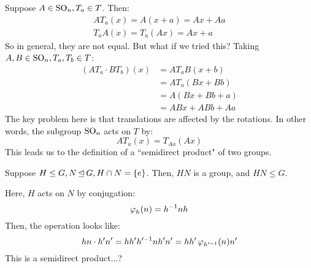 Suppose $ A \in \operatorname{SO}_{n}, T_{a} \in T $. Then:
\begin{gather*}
    AT_{a}(x) = A(x + a) = Ax + Aa \\
    T_{a}A(x) = T_{a}(Ax) = Ax + a
\end{gather*}
So in general, they are not equal. But what if we tried this?
Taking $ A, B \in \operatorname{SO}_{n}, T_{a}, T_{b} \in T $:
\begin{align*}
    (AT_{a} \cdot BT_{b})(x) & = AT_{a}B(x+b) \\
                            & = AT_{a}(Bx + Bb) \\
                            & = A(Bx + Bb + a) \\
                            & = ABx + ABb + Aa
\end{align*}
The key problem here is that translations are affected by the rotations.
In other words, the subgroup $ \operatorname{SO}_{n} $ acts on $ T $ by:
\begin{equation*}
    AT_{a}(x) = T_{Aa}(Ax)
\end{equation*}
This leads us to the definition of a ``semidirect product" of two groups.

Suppose $ H \leq G, N \operatorname{\trianglelefteq} G, H \cap N = \left\{{e}\right\} $.
Then, $ HN $ is a group, and $ HN \leq G $.

Here, $ H $ acts on $ N $ by conjugation:
\begin{equation*}
    \operatorname{\varphi}_{h}(n) = h^{-1}nh
\end{equation*}
Then, the operation looks like:
\begin{equation*}
    hn \cdot h'n' = hh'h'^{-1}nh'n' = hh'\operatorname{\varphi}_{h'^{-1}}(n)n'
\end{equation*}
This is a semidirect product...?
